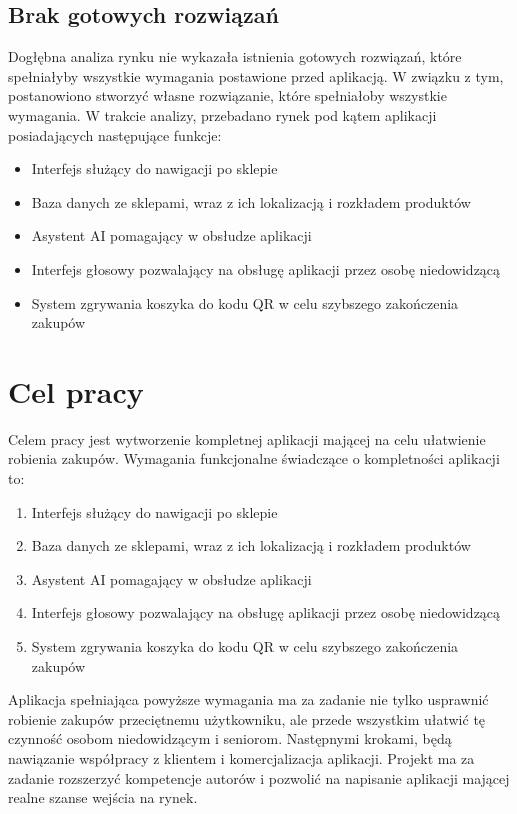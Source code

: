 \subsection{Brak gotowych rozwiązań}

Dogłębna analiza rynku nie wykazała istnienia gotowych rozwiązań, które spełniałyby wszystkie wymagania postawione przed aplikacją. W związku z tym, postanowiono stworzyć własne rozwiązanie, które spełniałoby wszystkie wymagania. W trakcie analizy, przebadano rynek pod kątem aplikacji posiadających następujące funkcje:
\begin{itemize}
    \item Interfejs służący do nawigacji po sklepie
    \item Baza danych ze sklepami, wraz z ich lokalizacją i rozkładem produktów
    \item Asystent AI pomagający w obsłudze aplikacji
    \item Interfejs głosowy pozwalający na obsługę aplikacji przez osobę niedowidzącą
    \item System zgrywania koszyka do kodu QR w celu szybszego zakończenia zakupów
\end{itemize}

\section{Cel pracy}

Celem pracy jest wytworzenie kompletnej aplikacji mającej na celu ułatwienie robienia zakupów. Wymagania funkcjonalne świadczące o kompletności aplikacji to:
\begin{enumerate}
    \item Interfejs służący do nawigacji po sklepie
    \item Baza danych ze sklepami, wraz z ich lokalizacją i rozkładem produktów
    \item Asystent AI pomagający w obsłudze aplikacji
    \item Interfejs głosowy pozwalający na obsługę aplikacji przez osobę niedowidzącą
    \item System zgrywania koszyka do kodu QR w celu szybszego zakończenia zakupów
\end{enumerate}
Aplikacja spełniająca powyższe wymagania ma za zadanie nie tylko usprawnić robienie zakupów przeciętnemu użytkowniku, ale przede wszystkim ułatwić tę czynność osobom niedowidzącym i seniorom. Następnymi krokami, będą nawiązanie współpracy z klientem i komercjalizacja aplikacji. Projekt ma za zadanie rozszerzyć kompetencje autorów i pozwolić na napisanie aplikacji mającej realne szanse wejścia na rynek. 



